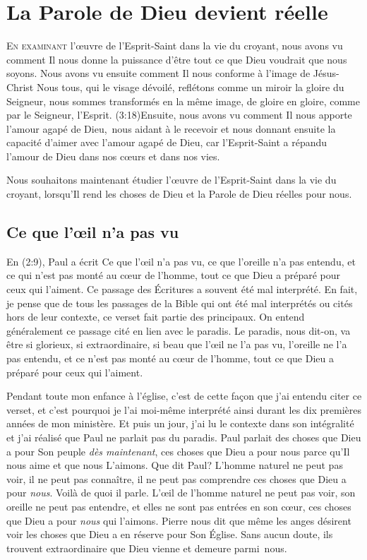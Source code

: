 \chapter{La Parole de Dieu devient r\'eelle}

\lettrine{E}{n examinant} l'\oe{}uvre
 de l'Esprit-Saint dans la vie du croyant,
 nous avons vu comment Il nous donne la puissance
 d'être tout ce que Dieu voudrait que nous soyons.
 Nous avons vu ensuite comment Il nous conforme à l'image de Jésus-Christ\frcolon{}
 \Og Nous tous, qui le visage dévoilé, reflétons comme un miroir la gloire
 du Seigneur, nous sommes transformés en la même image, de gloire en gloire,
 comme par le Seigneur, l'Esprit. \Fg{}
 (3:18)Ensuite, nous avons vu comment
 Il nous apporte l'amour agapé de Dieu,~nous aidant à le recevoir
 et nous donnant ensuite la capacité d'aimer
 avec l'amour agapé de Dieu, car l'Esprit-Saint a répandu l'amour de Dieu
 dans nos cœurs et dans nos vies.

Nous souhaitons maintenant étudier l'œuvre de l'Esprit-Saint dans la vie
 du croyant, lorsqu'Il rend les choses de Dieu et la Parole de Dieu
 réelles pour nous.


\section{Ce que l'\oe{}il n'a pas vu}

En (2:9), Paul a écrit\frcolon{}
 \Og Ce que l'œil n'a pas vu, ce que l'oreille n'a pas entendu,
 et ce qui n'est pas monté au cœur de l'homme, tout ce que Dieu
 a préparé pour ceux qui l'aiment. \Fg{}
 Ce passage des Écritures a souvent été mal interprété. En fait,
 je pense que de tous les passages de la Bible qui ont été mal interprétés
 ou cités hors de leur contexte, ce verset fait partie des principaux.
 On entend généralement ce passage cité en lien avec le paradis.
 Le paradis, nous dit-on, va être si glorieux, si extraordinaire,
 si beau que \Og l'œil ne l'a pas vu, l'oreille ne l'a pas entendu,
 et ce n'est pas monté au cœur de l'homme, tout ce que Dieu a préparé
 pour ceux qui l'aiment. \Fg{}
 \nowidow[4]

Pendant toute mon enfance à l'église, c'est de cette façon que j'ai entendu
 citer ce verset, et c'est pourquoi je l'ai moi-même interprété ainsi
 durant les dix premières années de mon ministère.
 Et puis un jour, j'ai lu le contexte dans son intégralité et j'ai réalisé
 que Paul ne parlait pas du paradis. Paul parlait des choses que Dieu
 a pour Son peuple \emph{dès maintenant},
 ces choses que Dieu a pour nous parce qu'Il
 nous aime et que nous L'aimons. Que dit Paul?
 L'homme naturel ne peut pas voir, il ne peut pas connaître,
 il ne peut pas comprendre ces choses que Dieu a pour \emph{nous}.
 Voilà de quoi il parle. L'œil de l'homme naturel ne peut pas voir,
 son oreille ne peut pas entendre, et elles ne sont pas entrées en son c\oe{}ur, ces choses que Dieu a pour \emph{nous} qui l'aimons.
 Pierre nous dit que même les anges désirent voir les choses que Dieu
 a en réserve pour Son Église.
 Sans aucun doute, ils trouvent extraordinaire que Dieu vienne
 et demeure parmi~nous.

